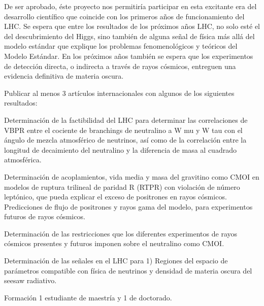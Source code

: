 De ser aprobado, éste proyecto nos permitiría participar en esta
excitante era del desarrollo científico que coincide con
los primeros años de funcionamiento del LHC.  Se espera que entre los
resultados de los próximos años LHC, no solo esté el del
descubrimiento del Higgs, sino también de alguna señal de física más
allá del modelo estándar que explique los problemas fenomenológicos y
teóricos del Modelo Estándar. En los próximos años también se espera
que los experimentos de detección directa, o indirecta a través de
rayos cósmicos, entreguen una evidencia definitiva de materia oscura.



Publicar al menos 3 artículos internacionales con algunos de los siguientes resultados:

Determinación de la factibilidad del LHC para determinar las correlaciones de VBPR entre el cociente de branchings de neutralino a W mu y W tau con el ángulo de mezcla atmosférico de neutrinos, así como de la correlación entre la longitud de decaimiento del neutralino y la diferencia de masa al cuadrado atmosférica.

Determinación de acoplamientos, vida media y masa del gravitino como CMOI en modelos de ruptura trilineal de paridad R (RTPR) con violación de número leptónico, que pueda explicar el exceso de positrones en rayos cósmicos. Predicciones de flujo de positrones y rayos gama del modelo, para experimentos futuros de rayos cósmicos. 

Determinación de las restricciones que los diferentes experimentos de rayos cósmicos 
presentes y futuros imponen sobre el neutralino como CMOI. 

Determinación de las señales en el LHC para 1) Regiones del espacio de parámetros compatible con física de neutrinos y densidad de materia oscura del seesaw radiativo. 

Formación 1 estudiante de maestría y 1 de doctorado.

